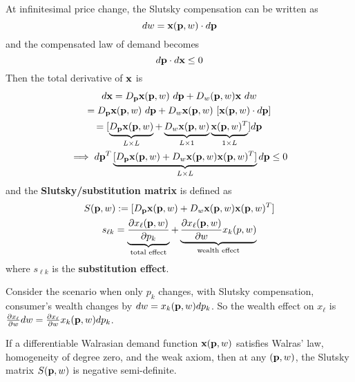 \documentclass{article}
\begin{document}
 			\begin{definition}
 				At infinitesimal price change, the Slutsky compensation can be written as 
 				\begin{equation}
 					dw = \textbf{x}(\textbf{p}, w) \cdot d\textbf{p}
 				\end{equation}
 				and the compensated law of demand becomes
 				\begin{equation}
 					d\textbf{p} \cdot d\textbf{x} \leq 0
 				\end{equation}
 				Then the total derivative of $\textbf{x}$ is 
 				\begin{gather}
 					d\textbf{x} = D_{\textbf{p}}\textbf{x}(\textbf{p}, w)\ d\textbf{p} + D_w(\textbf{p}, w) \textbf{x}\ dw \\
 					= D_{\textbf{p}}\textbf{x}(\textbf{p}, w)\ d\textbf{p} + D_w \textbf{x} (\textbf{p}, w)\ [\textbf{x}(\textbf{p}, w) \cdot d\textbf{p}] \\
 					= [\underbrace{D_{\textbf{p}}\textbf{x}(\textbf{p}, w)}_{L \times L} + \underbrace{D_w \textbf{x} (\textbf{p}, w)}_{L \times 1} \underbrace{\textbf{x}(\textbf{p}, w)^T}_{1 \times L}] d\textbf{p} \\
 					\implies d\textbf{p}^T 
 					\underbrace{[D_{\textbf{p}}\textbf{x}(\textbf{p}, w) + D_w \textbf{x} (\textbf{p}, w) \textbf{x}(\textbf{p}, w)^T]}_{L \times L} d\textbf{p} \leq 0
 				\end{gather}
 				and the \textbf{Slutsky/substitution matrix} is defined as
 				\begin{gather}
 					S(\textbf{p}, w) := [D_{\textbf{p}}\textbf{x}(\textbf{p}, w) + D_w \textbf{x} (\textbf{p}, w) \textbf{x}(\textbf{p}, w)^T] \\
 					s_{\ell k} = \underbrace{\frac{\partial{x_\ell(\textbf{p}, w)}}{\partial{p_k}}}_{\text{{total effect}}} + \underbrace{\frac{\partial{x_\ell(\textbf{p}, w)}}{\partial{w}} x_k (p, w)}_{\text{{wealth effect}}}
 				\end{gather}
 				where $s_{\ell k}$ is the \textbf{substitution effect}.
 			\end{definition}
 			
 			\begin{remark}
 				Consider the scenario when only $p_k$ changes, with Slutsky compensation, consumer's wealth changes by $dw = x_k(\textbf{p}, w) dp_k$. So the wealth effect on $x_\ell$ is $\frac{\partial{x_\ell}}{\partial{w}} dw = \frac{\partial{x_\ell}}{\partial{w}} x_k(\textbf{p}, w) dp_k$.
 			\end{remark}
 			
 			\begin{proposition}[2.F.2]
 				If a differentiable Walrasian demand function $\textbf{x}(\textbf{p}, w)$ satisfies Walras' law, homogeneity of degree zero, and the weak axiom, then at any $(\textbf{p}, w)$, the Slutsky matrix $S(\textbf{p}, w)$ is negative semi-definite.
 			\end{proposition}
 			
\end{document}
